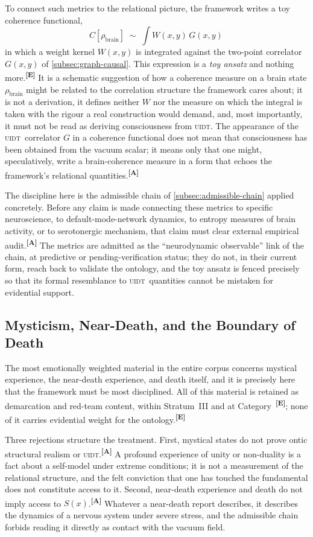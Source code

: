 \documentclass[12pt,a4paper,twoside]{article}
\theoremstyle{plain}
\theoremstyle{definition}
\theoremstyle{remark}
\newcommand{\UIDT}{\textsc{uidt}}
\newcommand{\catmark}[1]{\textsuperscript{\textsf{\textbf{[#1]}}}}
\begin{document}
To connect such metrics to the relational picture, the framework writes a toy coherence functional,
\[
 C[\rho_{\mathrm{brain}}] \;\sim\; \int W(x,y)\,G(x,y)\,
\]
in which a weight kernel $W(x,y)$ is integrated against the two-point correlator $G(x,y)$ of \cref{subsec:graph-causal}. This expression is a \emph{toy ansatz} and nothing more.\catmark{E} It is a schematic suggestion of how a coherence measure on a brain state $\rho_{\mathrm{brain}}$ might be related to the correlation structure the framework cares about; it is not a derivation, it defines neither $W$ nor the measure on which the integral is taken with the rigour a real construction would demand, and, most importantly, it must not be read as deriving consciousness from \UIDT. The appearance of the \UIDT\ correlator $G$ in a coherence functional does not mean that consciousness has been obtained from the vacuum scalar; it means only that one might, speculatively, write a brain-coherence measure in a form that echoes the framework's relational quantities.\catmark{A}

The discipline here is the admissible chain of \cref{subsec:admissible-chain} applied concretely. Before any claim is made connecting these metrics to specific neuroscience, to default-mode-network dynamics, to entropy measures of brain activity, or to serotonergic mechanism, that claim must clear external empirical audit.\catmark{A} The metrics are admitted as the ``neurodynamic observable'' link of the chain, at predictive or pending-verification status; they do not, in their current form, reach back to validate the ontology, and the toy ansatz is fenced precisely so that its formal resemblance to \UIDT\ quantities cannot be mistaken for evidential support.

\subsection{Mysticism, Near-Death, and the Boundary of Death}
\label{subsec:mysticism-nde-death}

The most emotionally weighted material in the entire corpus concerns mystical experience, the near-death experience, and death itself, and it is precisely here that the framework must be most disciplined. All of this material is retained as demarcation and red-team content, within Stratum~III and at Category~\catmark{E}; none of it carries evidential weight for the ontology.\catmark{E}

Three rejections structure the treatment. First, mystical states do not prove ontic structural realism or \UIDT.\catmark{A} A profound experience of unity or non-duality is a fact about a self-model under extreme conditions; it is not a measurement of the relational structure, and the felt conviction that one has touched the fundamental does not constitute access to it. Second, near-death experience and death do not imply access to $S(x)$.\catmark{A} Whatever a near-death report describes, it describes the dynamics of a nervous system under severe stress, and the admissible chain forbids reading it directly as contact with the vacuum field.
\end{document}
